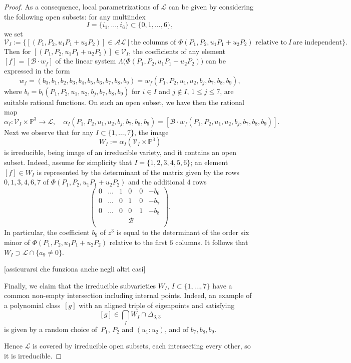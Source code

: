 \documentclass{amsart}
\theoremstyle{plain}
\theoremstyle{definition}
\newcommand{\p}{\mathbb{P}}
\newcommand{\sL}{\mathcal{L}}
\newcommand{\sV}{\mathcal{V}}
\newcommand{\blue}[1]{{\color{blue}[#1]}}
\begin{document}
\begin{proof}
As a consequence, local parametrizations of $\sL$ can be given by considering the following open subsets:
for any multiindex
%
$$
  I = \{i_1, \dots, i_6\} \subset \{0, 1, \dots, 6\},
$$
%
we set
%
$$
  \sV_I := \{ [(P_1, P_2, u_1 P_1 +u_2P_2)] \in \mathcal{AL} \ | \ \text{the\ columns\ of\ } \Phi
  (P_1, P_2, u_1 P_1 +u_2P_2) \text{\ relative \ to} \ I\ \text{are\ independent}\}.
$$
%
Then for $[(P_1, P_2, u_1 P_1 +u_2P_2)]\in \sV_I$, the coefficients of any element
$[f] =[\mathcal{B} \cdot w_f]$ of the linear system
$\Lambda \bigl( \Phi (P_1, P_2, u_1 P_1 +u_2P_2) \bigr)$ can be expressed in the form
%
\begin{equation}
\label{eq: parametrizzazione}
  w_f = (b_0,
  b_1,
  b_2,
  b_3,
  b_4,
  b_5, b_6,b_7,b_8,b_9)=w_f(P_1,P_2,u_1,u_2,b_j,b_7,b_8,b_9),
\end{equation}
%
where $b_i = b_i(P_1,P_2,u_1,u_2,b_j,b_7,b_8,b_9)$ for $i\in I$ and $j \not \in I$, $1\le j \le 7$, are suitable rational functions.
On such an open subset, we have then the rational map
%
$$
  \alpha_I \colon \sV_I \times \p^3 \to \sL, \quad
  \alpha_I (P_1,P_2,u_1,u_2,b_j,b_7,b_8,b_9)=
  [\mathcal{B} \cdot w_f(P_1,P_2,u_1,u_2,b_j,b_7,b_8,b_9)].
$$
%
Next we observe that for any $I \subset \{1,\dots, 7\}$, the image
%
$$
  W_I := \alpha_I (\sV_I \times \p^3)
$$
%
is irreducible, being image of an irreducible variety, and it
contains an open subset. Indeed, assume for simplicity that
$I=\{1,2,3,4,5,6\}$; an element $[f]\in W_I$ is represented by the determinant of the
matrix given by the rows $0,1,3,4,6,7$ of $\Phi (P_1, P_2, u_1 P_1 +u_2P_2)$ and the additional $4$ rows
%
\[
  \left(
  \begin{array}{cccccc}
    0 & \dots & 1&0&0&-b_6 \\
    0 & \dots & 0&1&0&-b_7 \\
    0 & \dots & 0&0&1&-b_8 \\
    & & & \mathcal{B} & & \\
  \end{array}
  \right).
\]
%
In particular, the coefficient $b_9$ of $z^3$ is equal to the determinant of the order six minor of $\Phi (P_1, P_2, u_1 P_1 +u_2P_2)$ relative to the first $6$ columns. It follows that $W_I \supset \sL \cap \{ a_9 \neq 0\}$.

\blue{assicurarsi che funziona anche negli altri casi}

Finally, we claim that the irreducible subvarieties $W_I$, $I\subset \{1,\dots, 7\}$ have a common non-empty intersection
including internal points. Indeed, an example of a polynomial
class~$[g]$ with an aligned triple of eigenpoints and satisfying
%
$$
  [g] \in \bigcap_I W_I \cap \Delta_{3,3}
$$
%
is given by a random choice of~$P_1$, $P_2$ and $(u_1:u_2)$, and of $b_7,b_8,b_9$.

Hence $\sL$ is covered by irreducible open subsets, each intersecting every other, so it is irreducible.
\end{proof}
\end{document}
